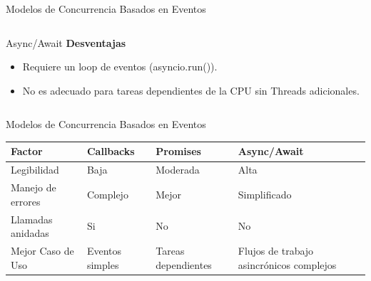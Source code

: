 \documentclass[11pt]{beamer}
\begin{document}
\begin{frame}{Modelos de Concurrencia Basados en Eventos}
\begin{columns}[T]
\begin{block}{Async/Await}
				\vspace{0.1cm}
				\textbf{Desventajas}
				\begin{itemize}
					\item Requiere un loop de eventos (asyncio.run()).
					\item No es adecuado para tareas dependientes de la CPU sin Threads adicionales.
				\end{itemize}
			\end{block}
			
		\end{columns}
	\end{frame}
	
	\begin{frame}{Modelos de Concurrencia Basados en Eventos}
		\footnotesize 
		\begin{table}
			\centering
			\renewcommand{\arraystretch}{1.2}
			\begin{tabular}{|p{3cm}|p{2.5cm}|p{2.5cm}|p{2.5cm}|}
				\hline
				\cellcolor{blue!15}\textbf{Factor} &  \cellcolor{blue!15}\textbf{Callbacks} & \cellcolor{blue!15}\textbf{Promises}  & \cellcolor{blue!15}\textbf{Async/Await} \\ \hline
				\cellcolor{blue!15}Legibilidad & Baja & Moderada & Alta \\ \hline
				\cellcolor{blue!15}Manejo de errores & Complejo & Mejor & Simplificado \\ \hline
				\cellcolor{blue!15} Llamadas anidadas & Si & No & No \\ \hline
				\cellcolor{blue!15} Mejor Caso de Uso & Eventos simples & Tareas dependientes & Flujos de trabajo asincrónicos complejos \\ \hline
			\end{tabular}
		\end{table}
	\end{frame}
	
\end{document}
